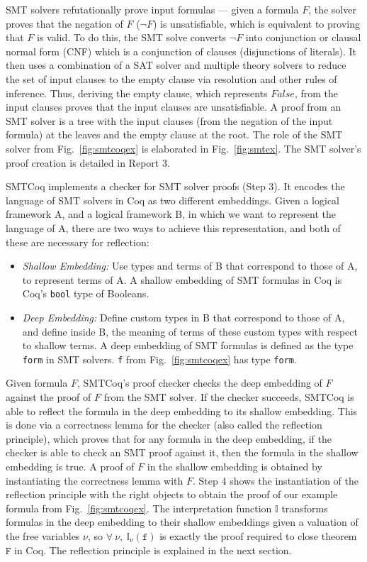 \documentclass{article}
\begin{document}
	SMT solvers refutationally prove 
	input formulas --- given a formula
	$F$, the solver proves that the 
	negation of $F$ ($\neg F$) is 
	unsatisfiable, which is equivalent
	to proving that $F$ is valid. 
	To do this, the SMT solve converts 
	$\neg F$ into conjunction or clausal 
	normal form (CNF) which is a 
	conjunction of clauses (disjunctions 
	of literals). It then uses 
	a combination of a SAT solver and 
	multiple theory	solvers to reduce 
	the set of input clauses to the 
	empty clause via resolution
	and other rules of inference. Thus,
	deriving the empty clause, which 
	represents $False$, from the input 
	clauses proves that the input clauses 
	are unsatisfiable. A proof
	from an SMT solver is a tree 
	with the input clauses (from the 
	negation of the input formula) at
	the leaves and the empty clause
	at the root. The role of the SMT
	solver from Fig.~\ref{fig:smtcoqex}
	is elaborated in Fig.~\ref{fig:smtex}.
	The SMT solver's proof creation is 
	detailed in Report 3.
	
	SMTCoq implements a checker for 
	SMT solver proofs (Step 3). It 
	encodes the language of SMT solvers
	in Coq as two different embeddings. 
	Given a logical framework A, and 
	a logical framework B, in which we 
	want to represent the language of A, 
	there are two ways to achieve this
	representation, and 
	both of these are necessary for 
	reflection:
	\begin{itemize}
		\item \textit{Shallow Embedding: }
		Use types and terms of B that 
		correspond to those of A, to 
		represent terms of A. A shallow
		embedding of SMT formulas in 
		Coq is Coq's \texttt{bool} 
		type of Booleans.
		\item\textit{Deep Embedding: }
		Define custom types in B that 
		correspond to those of A, and 
		define inside B, the meaning of 
		terms of these custom types with 
		respect to shallow terms. A 
		deep embedding of SMT formulas 
		is defined as the type 
		\texttt{form} in SMT solvers.
		\texttt{f} from 
		Fig.~\ref{fig:smtcoqex} has
		type \texttt{form}.
	\end{itemize}

	Given formula $F$, SMTCoq's proof 
	checker checks the deep embedding of 
	$F$ against the proof of $F$ from the 
	SMT solver. If the checker succeeds, 
	SMTCoq is able to reflect the formula in 
	the deep embedding to its shallow 
	embedding. This is done via a 
	correctness lemma for the checker
	(also called the reflection principle),
	which proves that for any 
	formula in the deep embedding, if 
	the checker is able to check an SMT
	proof against it, then the formula in 
	the shallow embedding is true. A 
	proof of $F$ in the shallow 
	embedding is obtained by instantiating 
	the correctness lemma with $F$.
	Step 4 shows the instantiation of 
	the reflection principle with 
	the right objects to obtain the 
	proof of our example formula 
	from Fig.~\ref{fig:smtcoqex}. 
	The interpretation function
	$\mathbb{I}$ transforms 
	formulas in the deep embedding
	to their shallow embeddings
	given a valuation of the free 
	variables $\nu$, so 
	$\forall\ \nu,\ 
	\mathbb{I}_{\nu}(\texttt{f})$
	is exactly the proof required 
	to close theorem $\texttt{F}$
	in Coq. The reflection principle 
	is explained in the next section.	
	
\end{document}
